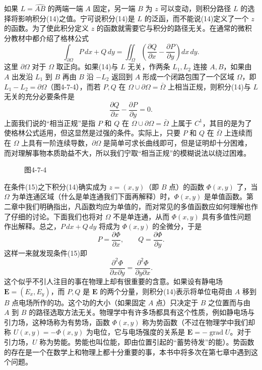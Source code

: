如果 $L=\widehat{AB}$ 的两端一端 $A$ 固定，另一端 $B$ 为 $z$ 可以变动，则积分路径 $L$ 的选择将影响积分(14)之值。宁可说积分(14)是 $L$ 的泛函，而不能说(14)定义了一个 $z$ 的函数。为了使此积分定义 $z$ 的函数就需要它与积分的路径无关。在通常的微积分教材中都介绍了格林公式
\[
 \int_{\partial\Omega}P\,dx+Q\,dy
 =\iint_\Omega\left(\frac{\partial Q}{\partial x}-\frac{\partial P}{\partial y}\right)dx\,dy.
\]
这里 $\partial\Omega$ 对于 $\Omega$ 取正向。如果(14)与 $L$ 无关，作两条 $L_1,L_2$ 连接 $A,B$，如果由 $A$ 出发沿 $L_1$ 到 $B$ 再由 $B$ 沿 $-L_2$ 返回到 $A$ 形成一个闭路包围了一个区域 $\Omega$，即 $L_1-L_2=\partial\Omega$（图4-7-4），而若 $P,Q$ 在 $\Omega\cup\partial\Omega=\bar\Omega$ 上相当正规，则积分(14)与 $L$ 无关的充分必要条件是
\begin{equation}
 \frac{\partial Q}{\partial x}-\frac{\partial P}{\partial y}=0.
 \tag{15}
\end{equation}
上面我们说的“相当正规”是指 $P$ 和 $Q$ 在 $\Omega\cup\partial\Omega=\bar\Omega$ 上属于 $C^1$，其目的是为了使格林公式适用，但这显然是过强的条件。实际上，只要 $P$ 和 $Q$ 在 $\bar\Omega$ 上连续而在 $\Omega$ 上具有一阶连续导数，$\partial\Omega$ 是简单可求长曲线即可，但是证明却十分困难，而对理解事物本质助益不大，所以我们宁取“相当正规”的模糊说法以绕过困难。

\begin{figure}[htbp]
\centering
{}
\caption*{图4-7-4}
\end{figure}

在条件(15)之下积分(14)确实成为 $z=(x,y)$（即 $B$ 点）的函数 $\Phi(x,y)$ 了，当 $\Omega$ 为单连通区域（什么是单连通我们下面再解释）时，$\Phi(x,y)$ 是单值函数。第二章中我们明确指出，凡函数均应为单值的，而对常见的多值函数应如何理解也作了仔细的讨论。下面我们也将对 $\Omega$ 不是单连通，从而 $\Phi(x,y)$ 具有多值性问题作出解释。总之，$P\,dx+Q\,dy$ 将成为 $\Phi(x,y)$ 的全微分，于是
\[
 P=\frac{\partial\Phi}{\partial x},\qquad Q=\frac{\partial\Phi}{\partial y}.
\]
这样一来就发现条件(15)即
\[
 \frac{\partial^2\Phi}{\partial x\partial y}
 =\frac{\partial^2\Phi}{\partial y\partial x}.
\]
这个似乎不引人注目的事在物理上却有很重要的含意。如果设有静电场 $\mathbf E=(E_x,E_y)$，而 $P,Q$ 是 $\mathbf E$ 的两个分量，则积分(14)表示将单位电荷由 $A$ 移到 $B$ 点电场所作的功。这个功的大小（如果固定 $A$ 点）只决定于 $B$ 之位置而与由 $A$ 到 $B$ 的路径选取方法无关。物理学中有许多场都具有这个性质，例如静电场与引力场，这种场称为有势场，函数 $\Phi(x,y)$ 称为势函数（不过在物理学中我们却称 $U(x,y)=-\Phi(x,y)$ 为电位，它与电场强度的关系是 $\mathbf E=-\operatorname{grad}U$。对于引力场，$U$ 称为势能。势能也叫位能，即由位置引起的“蓄势待发”的能）。势函数的存在是一个在数学上和物理上都十分重要的事，本书中将多次在第七章中遇到这个问题。

